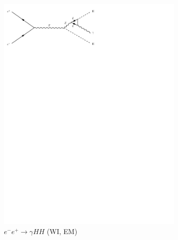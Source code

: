 \begin{figure}[h]
\begin{subfigure}[b]{0.3\textwidth}
    \includegraphics[trim={0.5cm 22cm 10cm 0cm},width=\textwidth]{../Diagrams/D9.pdf}
    \caption{$e^-e^+ \rightarrow \gamma HH$ (WI, EM)}
    \label{fey:9}
  \end{subfigure}
  \newline
  \newline
  \begin{subfigure}[b]{0.3\textwidth}

\end{subfigure}
\end{figure}
